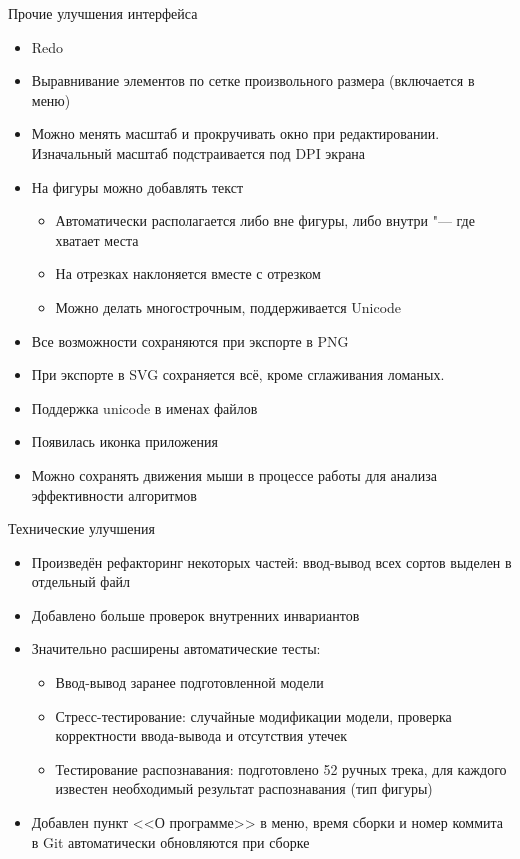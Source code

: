 \documentclass[utf8,xcolor=table]{beamer}
\begin{document}
\begin{frame}[t]{Прочие улучшения интерфейса}
  \begin{itemize}
  \item Redo
  \item Выравнивание элементов по сетке произвольного размера (включается в меню)
  \item Можно менять масштаб и прокручивать окно при редактировании. Изначальный масштаб подстраивается под DPI экрана
  \item На фигуры можно добавлять текст
    \begin{itemize}
    \item Автоматически располагается либо вне фигуры, либо внутри "--- где хватает места
    \item На отрезках наклоняется вместе с отрезком
    \item Можно делать многострочным, поддерживается Unicode
    \end{itemize}
  \item Все возможности сохраняются при экспорте в PNG
  \item При экспорте в SVG сохраняется всё, кроме сглаживания ломаных.
  \item Поддержка unicode в именах файлов
  \item Появилась иконка приложения
  \item Можно сохранять движения мыши в процессе работы для анализа эффективности алгоритмов
  \end{itemize}
\end{frame}

\begin{frame}[t]{Технические улучшения}
  \begin{itemize}
  \item Произведён рефакторинг некоторых частей: ввод-вывод всех сортов выделен в отдельный файл
  \item Добавлено больше проверок внутренних инвариантов
  \item Значительно расширены автоматические тесты:
    \begin{itemize}
    \item Ввод-вывод заранее подготовленной модели
    \item Стресс-тестирование: случайные модификации модели, проверка корректности ввода-вывода и отсутствия утечек
    \item Тестирование распознавания: подготовлено 52 ручных трека, для каждого известен необходимый результат распознавания (тип фигуры)
    \end{itemize}
  \item Добавлен пункт <<О программе>> в меню, время сборки и номер коммита в Git автоматически обновляются при сборке
  \end{itemize}
\end{frame}
\end{document}

